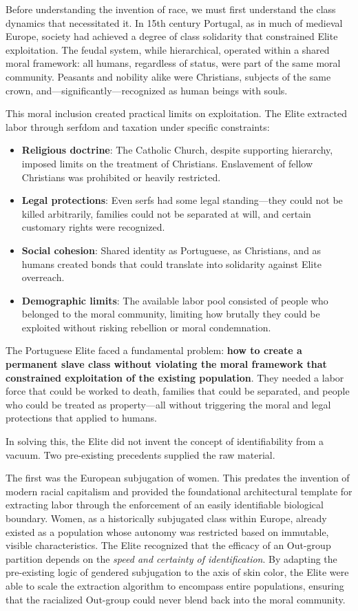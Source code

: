 Before understanding the invention of race, we must first understand the class dynamics that necessitated it. In 15th century Portugal, as in much of medieval Europe, society had achieved a degree of class solidarity that constrained Elite exploitation. The feudal system, while hierarchical, operated within a shared moral framework: all humans, regardless of status, were part of the same moral community. Peasants and nobility alike were Christians, subjects of the same crown, and---significantly---recognized as human beings with souls.

This moral inclusion created practical limits on exploitation. The Elite extracted labor through serfdom and taxation under specific constraints:
\begin{itemize}
    \item \textbf{Religious doctrine}: The Catholic Church, despite supporting hierarchy, imposed limits on the treatment of Christians. Enslavement of fellow Christians was prohibited or heavily restricted.
    \item \textbf{Legal protections}: Even serfs had some legal standing---they could not be killed arbitrarily, families could not be separated at will, and certain customary rights were recognized.
    \item \textbf{Social cohesion}: Shared identity as Portuguese, as Christians, and as humans created bonds that could translate into solidarity against Elite overreach.
    \item \textbf{Demographic limits}: The available labor pool consisted of people who belonged to the moral community, limiting how brutally they could be exploited without risking rebellion or moral condemnation.
\end{itemize}

The Portuguese Elite faced a fundamental problem: \textbf{how to create a permanent slave class without violating the moral framework that constrained exploitation of the existing population}. They needed a labor force that could be worked to death, families that could be separated, and people who could be treated as property---all without triggering the moral and legal protections that applied to humans.

In solving this, the Elite did not invent the concept of identifiability from a vacuum. Two pre-existing precedents supplied the raw material.

The first was the European subjugation of women. This predates the invention of modern racial capitalism and provided the foundational architectural template for extracting labor through the enforcement of an easily identifiable biological boundary. Women, as a historically subjugated class within Europe, already existed as a population whose autonomy was restricted based on immutable, visible characteristics. The Elite recognized that the efficacy of an Out-group partition depends on the \textit{speed and certainty of identification}. By adapting the pre-existing logic of gendered subjugation to the axis of skin color, the Elite were able to scale the extraction algorithm to encompass entire populations, ensuring that the racialized Out-group could never blend back into the moral community.

